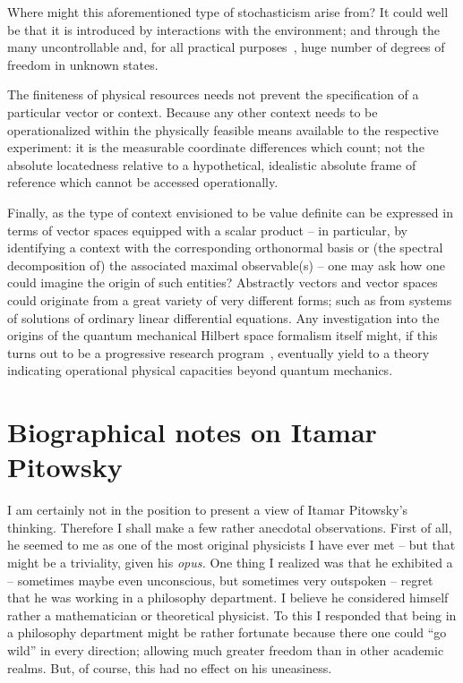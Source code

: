 \documentclass[%
  twocolumn,
 showpacs,
 showkeys,
 preprintnumbers,
 amsmath,amssymb,
 aps,
  pra,
  longbibliography,
 ]{revtex4-1}
\begin{document}
Where might this aforementioned type of stochasticism arise from?
It could well be that it is introduced by interactions with the environment;
and through the many uncontrollable and, for all practical purposes~\citep{bell-a},
huge number of degrees of freedom in unknown states.

The finiteness of physical resources needs not prevent the specification of a particular vector or context.
Because any other context needs to be operationalized within the physically feasible means
available to the respective experiment: it is the measurable coordinate differences which count;
not the absolute locatedness relative to a hypothetical, idealistic absolute frame of reference
which cannot be accessed operationally.

Finally, as the type of context envisioned to be value definite can be expressed in terms of
vector spaces equipped with a scalar product
--
in particular, by identifying
a context with the corresponding
orthonormal basis
or (the spectral decomposition of) the associated maximal observable(s)
--
one may ask how one could imagine the origin of such entities?
Abstractly vectors and vector spaces could originate from a great variety of very different forms;
such as from systems of solutions of ordinary linear differential equations.
Any investigation into the origins of the quantum mechanical
Hilbert space formalism itself might,
if this turns out to be a progressive research program~\citep{lakatosch},
eventually yield to a theory indicating
operational physical capacities beyond quantum mechanics.


\section{Biographical notes on Itamar Pitowsky}

I am certainly not in the position to present a view of Itamar Pitowsky's thinking.
Therefore I shall make a few rather anecdotal observations.
First of all, he seemed to me as one of the most original physicists I have ever met
-- but that might be a triviality, given his {\it opus.}
One thing I realized was that he exhibited a -- sometimes maybe even unconscious, but sometimes very outspoken --
regret that he was working in a philosophy department.
I believe he considered himself rather a mathematician or theoretical physicist.
To this I responded that being in a philosophy department might be rather fortunate because there one could ``go wild'' in every direction;
allowing much greater freedom than in other academic realms.
But, of course, this had no effect on his uneasiness.
\end{document}
